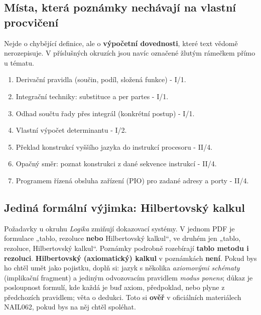 \subsection{Místa, která poznámky nechávají na vlastní procvičení}
\label{sec:procvic}
Nejde o chybějící definice, ale o \textbf{výpočetní dovednosti}, které text vědomě nerozepisuje. V příslušných okruzích jsou navíc označené žlutým rámečkem přímo u tématu.
\begin{enumerate}[leftmargin=1.5em]
  \item Derivační pravidla (součin, podíl, složená funkce) - I/1.
  \item Integrační techniky: substituce a per partes - I/1.
  \item Odhad součtu řady přes integrál (konkrétní postup) - I/1.
  \item Vlastní výpočet determinantu - I/2.
  \item Překlad konstrukcí vyššího jazyka do instrukcí procesoru - II/4.
  \item Opačný směr: poznat konstrukci z dané sekvence instrukcí - II/4.
  \item Programem řízená obsluha zařízení (PIO) pro zadané adresy a porty - II/4.
\end{enumerate}

\subsection{Jediná formální výjimka: Hilbertovský kalkul}
\label{sec:vyjimka}
\begin{gapbox}
Požadavky u okruhu \emph{Logika} zmiňují dokazovací systémy. V jednom PDF je formulace „tablo, rezoluce \textbf{nebo} Hilbertovský kalkul“, ve druhém jen „tablo, rezoluce, Hilbertovský kalkul“. Poznámky podrobně rozebírají \textbf{tablo metodu i rezoluci}. \textbf{Hilbertovský (axiomatický) kalkul} v poznámkách \textbf{není}. Pokud bys ho chtěl umět jako pojistku, doplň si: jazyk s několika \emph{axiomovými schématy} (implikační fragment) a jediným odvozovacím pravidlem \emph{modus ponens}; důkaz je posloupnost formulí, kde každá je buď axiom, předpoklad, nebo plyne z předchozích pravidlem; věta o dedukci. Toto si \textbf{ověř} v oficiálních materiálech NAIL062, pokud bys na něj chtěl spoléhat.
\end{gapbox}
